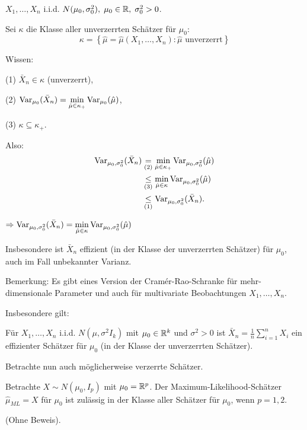 \documentclass{tstextbook}
\begin{document}
\begin{example}
	$ X_1,\ldots,X_n $ i.i.d. $ N(\mu_0,\sigma_0^2), \; \mu_0 \in \mathbb R, \; \sigma_0^2 > 0 $.
	
	Sei $ \kappa $ die Klasse aller unverzerrten Schätzer für $ \mu_0 $:
	\[
	\kappa = \left\lbrace \hat{\mu} = \hat{\mu}(X_1,\ldots,X_n) \colon \hat{\mu} \text{ unverzerrt}\right\rbrace
	\]
	
	Wissen: 
	
	(1) $ \bar{X}_n \in \kappa $ (unverzerrt),
	
	(2) $ \operatorname{Var}_{\mu_0}(\bar{X}_n) = \underset{\hat{\mu}\in\kappa_+}{\min}\operatorname{Var}_{\mu_0}(\hat{\mu}) $,
	
	(3) $ \kappa \subseteq \kappa_+ $. 
	
	Also: 
	\[
	\begin{aligned}
		\operatorname{Var}_{\mu_0,\sigma_0^2}(\bar{X}_n) & \underset{(2)}{=} \underset{\hat{\mu}\in\kappa_+}{\min}\operatorname{Var}_{\mu_0, \sigma_0^2}(\hat{\mu}) \\
		& \underset{(3)}{\le} \underset{\hat{\mu}\in\kappa}{\min}\operatorname{Var}_{\mu_0,\sigma_0^2}(\hat{\mu}) \\
		& \underset{(1)}{\le} \operatorname{Var}_{\mu_0,\sigma_0^2}(\bar{X}_n).
	\end{aligned}
	\]
	
	$ \Rightarrow \operatorname{Var}_{\mu_0,\sigma_0^2}(\bar{X}_n) = \underset{\hat{\mu}\in\kappa}{\min}\operatorname{Var}_{\mu_0,\sigma_0^2}(\hat{\mu}) $
	
	Insbesondere ist $ \bar{X}_n $ effizient (in der Klasse der unverzerrten Schätzer) für $ \mu_0 $, auch im Fall unbekannter Varianz.
\end{example}

\begin{remark}
	Bemerkung: Es gibt eines Version der Cramér-Rao-Schranke für mehr-dimensionale Parameter und auch für multivariate Beobachtungen $ X_1,\ldots,X_n $. 
	
	Insbesondere gilt: 
	
	Für $ X_1,\ldots,X_n $ i.i.d. $ N(\mu,\sigma^2I_k) $ mit $ \mu_0 \in \mathbb R^k $ und $ \sigma^2 > 0 $ ist $ \bar{X}_n = \frac{1}{n}\sum_{i=1}^{n}X_i $ ein effizienter Schätzer für $ \mu_0 $ (in der Klasse der unverzerrten Schätzer).
\end{remark}

Betrachte nun auch möglicherweise verzerrte Schätzer.

\begin{theorem}
	Betrachte $ X\sim N(\mu_0,I_p) $ mit $ \mu_0 = \mathbb R^p $. Der Maximum-Likelihood-Schätzer $ \hat{\mu}_{ML} = X $ für $ \mu_0 $ ist zulässig in der Klasse aller Schätzer für $ \mu_0 $, wenn $ p=1,2. $
\end{theorem}
(Ohne Beweis). 
\end{document}
